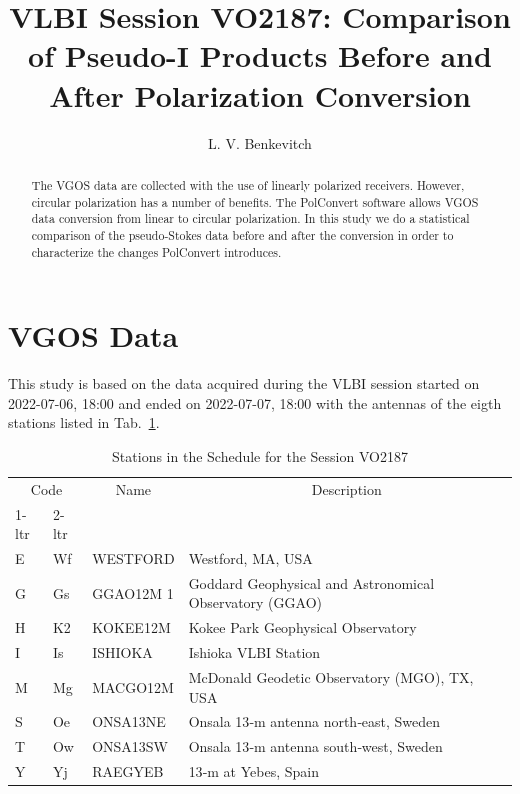 \documentclass[letterpaper,twoside,12pt]{article}
\title{VLBI Session VO2187: Comparison of Pseudo-I Products Before and After Polarization Conversion}
\author[1]{L. V. Benkevitch}
\affil[1]{\small MIT Haystack observatory, Westford, MA 01886, USA.}
\begin{document}
\maketitle

\begin{abstract}

The VGOS data are collected with the use of linearly polarized receivers. However, circular polarization has a number of benefits. The PolConvert software allows VGOS data conversion from linear to circular polarization. In this study we do a statistical comparison of the pseudo-Stokes data before and after the conversion in order to characterize the changes PolConvert introduces.

\end{abstract}


\tableofcontents

\section{VGOS Data}

This study is based on the data acquired during the VLBI session started on 2022-07-06, 18:00 and ended on 2022-07-07, 18:00 with the antennas of the eigth stations listed in Tab.~\ref{stations}.

\begin{table}[ht!]
  \begin{center}
    \caption{Stations in the Schedule for the Session VO2187}
    \label{stations}
    \begin{tabular}{l|l|l|l}
    \multicolumn{2}{c|}{Code} & \multicolumn{1}{c|}{Name} & \multicolumn{1}{c}{Description} \\                       %
     1-ltr & 2-ltr &  &  \\
      \hline
E & Wf & WESTFORD  & Westford, MA, USA \\
G & Gs & GGAO12M  1 &	Goddard Geophysical and Astronomical Observatory (GGAO) \\
H & K2 & KOKEE12M  & Kokee Park Geophysical Observatory \\
I & Is & ISHIOKA   & Ishioka VLBI Station \\
M & Mg & MACGO12M  & McDonald Geodetic Observatory (MGO), TX, USA \\
S & Oe & ONSA13NE  & Onsala 13‐m antenna north‐east, Sweden \\
T & Ow & ONSA13SW  & Onsala 13‐m antenna south‐west, Sweden \\
Y & Yj & RAEGYEB   & 13‐m at Yebes, Spain
    \end{tabular}
  \end{center}
\end{table}
  
\end{document}
